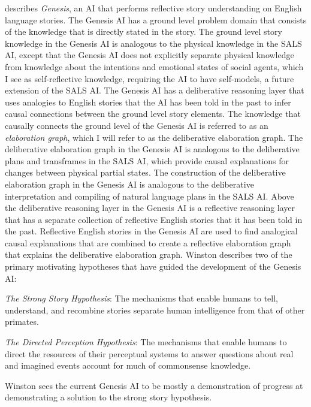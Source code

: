 \cite{winston:2011} describes {\emph{Genesis}}, an AI that performs
reflective story understanding on English language stories.  The
Genesis AI has a ground level problem domain that consists of the
knowledge that is directly stated in the story.  The ground level
story knowledge in the Genesis AI is analogous to the physical
knowledge in the SALS AI, except that the Genesis AI does not
explicitly separate physical knowledge from knowledge about the
intentions and emotional states of social agents, which I see as
self-reflective knowledge, requiring the AI to have self-models, a
future extension of the SALS AI.  The Genesis AI has a deliberative
reasoning layer that uses analogies to English stories that the AI has
been told in the past to infer causal connections between the ground
level story elements.  The knowledge that causally connects the ground
level of the Genesis AI is referred to as an {\emph{elaboration
    graph}}, which I will refer to as the deliberative elaboration
graph.  The deliberative elaboration graph in the Genesis AI is
analogous to the deliberative plans and transframes in the SALS AI,
which provide causal explanations for changes between physical partial
states.  The construction of the deliberative elaboration graph in the
Genesis AI is analogous to the deliberative interpretation and
compiling of natural language plans in the SALS AI.  Above the
deliberative reasoning layer in the Genesis AI is a reflective
reasoning layer that has a separate collection of reflective English
stories that it has been told in the past.  Reflective English stories
in the Genesis AI are used to find analogical causal explanations that
are combined to create a reflective elaboration graph that explains
the deliberative elaboration graph.  Winston describes two of the
primary motivating hypotheses that have guided the development of the
Genesis AI:
\begin{packed_enumerate}
\item{{\emph{The Strong Story Hypothesis}}: The mechanisms that enable
  humans to tell, understand, and recombine stories separate human
  intelligence from that of other primates.}
\item{{\emph{The Directed Perception Hypothesis}}: The mechanisms that
  enable humans to direct the resources of their perceptual systems to
  answer questions about real and imagined events account for much of
  commonsense knowledge.}
\end{packed_enumerate}
Winston sees the current Genesis AI to be mostly a demonstration of
progress at demonstrating a solution to the strong story hypothesis.
